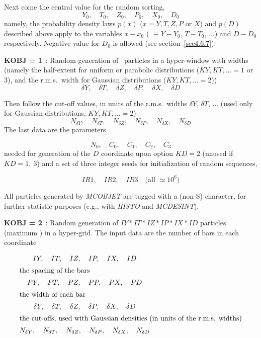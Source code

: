 \noindent Next come the central value for the random sorting, 
$$    Y_0,\quad    T_0,\quad    Z_0,\quad P_0,\quad  X_0, \quad D_0 $$
%
namely, the probability density laws $p(x)$ ($x= Y, T, Z, P$ or $X$) 
and $p(D)$ described above apply to the variables $x-x_0$
( $\equiv Y- Y_0$, $T-T_0$, ...) and $D- D_0$ respectively. Negative 
value for $D_0$ is allowed (see section~\ref{sec4.6.7}).
 \bigskip

\noindent\textbf{KOBJ  =  1}~: Random  generation of \IMAX\ particles  
in a hyper-window with widths
(namely the half-extent for uniform or parabolic distributions ($KY, 
KT, ... =1$ or 3), and  the r.m.s.~width for Gaussian distributions ($KY, 
KT, ... =2$))
$$   \delta Y,\quad   \delta T,\quad   \delta Z,\quad   \delta P,\quad   \delta X,\quad  \delta D $$

\noindent Then follow the cut-off values, in units of the 
r.m.s.~widths $\delta Y$, $\delta T$, ... (used only for  Gaussian distributions,  
$KY, KT, ... =2$)
$$
	N_{\delta Y},\quad N_{\delta T},\quad N_{\delta Z},\quad N_{\delta P},\quad N_{\delta X},\quad N_{\delta D}
$$	 
\noindent The last data are the parameters 

$$ N_0,\quad C_0,\quad C_1,\quad C_2,\quad C_3 $$ 
%
 needed for generation of the $ D $ coordinate upon option
 $ KD  =  2$ (unused if $ KD = 1,~3$) and a set of three integer seeds for initialization of random sequences,
 
 $$ IR1,\quad   IR2, \quad  IR3 \quad \text{(all $\simeq 10^6 $)}$$
%

\medskip

\noindent All particles generated by \textsl{MCOBJET}  are tagged with
a (non-S) character, for further statistic purposes 
(e.g., with \textsl{HISTO} and \textsl{MCDESINT}).  
\medskip

\noindent\textbf{KOBJ  =  2}~: Random  generation of 
$ IY \ast   IT  \ast IZ \ast  IP  \ast  IX  \ast  ID $ particles    
(maximum \imax) in a  hyper-grid.  The input data are the number of bars    in 
each coordinate

 \begin{gather*}
	 IY,\quad IT,\quad IZ,\quad IP,\quad IX, \quad ID \\
%
\intertext{the spacing of the bars} 
	PY,\quad PT,\quad PZ,\quad PP,\quad PX, \quad PD \\
%
\intertext{the width of each bar} 
	\delta Y,\quad \delta T,\quad \delta Z,\quad \delta P,\quad \delta X,\quad \delta D  \\
%
\intertext{the cut-offs, used with Gaussian densities (in units of the r.m.s. widths)}
	N_{\delta Y},\quad N_{\delta T},\quad N_{\delta Z},\quad N_{\delta P},\quad N_{\delta X},\quad N_{\delta D}
 \end{gather*}

